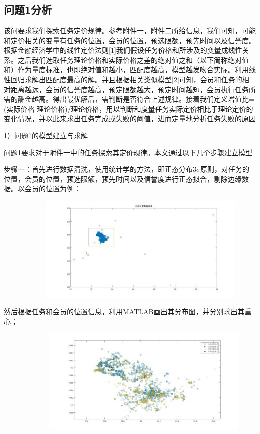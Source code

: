 \documentclass{ctexart}
\begin{document}
\section{}
\subsection{问题1分析}

该问要求我们探索任务定价规律。参考附件一，附件二所给信息，我们可知，可能和定价相关的变量有任务的位置，会员的位置，预选限额，预先时间以及信誉度。根据金融经济学中的线性定价法则[1]我们假设任务价格和所涉及的变量成线性关系。之后我们选取任务理论价格和实际价格之差的绝对值之和（以下简称绝对值和）作为量度标准，也即绝对值和越小，匹配度越高，模型越发吻合实际。利用线性回归求解出匹配度最高的解。并且根据相关类似模型[2]可知，会员和任务的相对距离越远，会员的信誉度越高，预定限额越大，预定时间越短，会员执行任务所需的酬金越高。得出最优解后，需判断是否符合上述规律。接着我们定义增值比=(实际价格-理论价格)/理论价格，用以判断和度量任务实际定价相比于理论定价的变化情况，并以此来求出任务完成或失败的阈值，进而定量地分析任务失败的原因

1）问题1的模型建立与求解

问题1要求对于附件一中的任务探索其定价规律。本文通过以下几个步骤建立模型

步骤一：首先进行数据清洗，使用统计学的方法，即正态分布$3\sigma$原则，对任务的位置，会员的位置，预选限额，预先时间以及信誉度进行正态拟合，剔除边缘数据。以会员的位置为例：

 \ \ \ \ \ \ \ \ \ \ \ \  \includegraphics[width=10cm]{1.jpg}


 然后根据任务和会员的位置信息，利用MATLAB画出其分布图，并分别求出其重心；

\ \ \ \  \ \ \ \ \ \ \ \ \ \includegraphics[width=10cm]{2.jpg}
\end{document}
